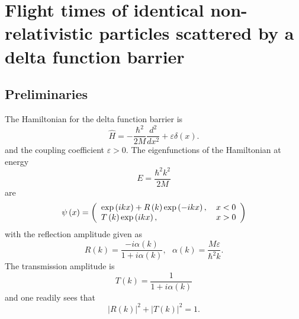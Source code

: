 \documentclass[preprint,aps]{revtex4}
\begin{document}
\bigskip 

\bigskip 



\renewcommand{\theequation}{4.\arabic{equation}} \setcounter{section}{3} %
\setcounter{equation}{0}

\section{\protect\bigskip Flight times of identical non-relativistic particles scattered by a
delta function barrier}

\subsection{Preliminaries}

The Hamiltonian for the delta function barrier is
\begin{equation}
\hat{H}=-\frac{\hbar ^{2}}{2M}\frac{d^{2}}{dx^{2}}+\varepsilon \delta \left(
x\right) .  \label{3.1}
\end{equation}%
and the coupling coefficient $\varepsilon >0$. The eigenfunctions of the
Hamiltonian at energy
\begin{equation}
E=\frac{\hbar ^{2}k^{2}}{2M}  \label{3.2}
\end{equation}%
are
\begin{equation}
\psi \left( x\right) =\left(
\begin{array}{c}
\exp \left( ikx\right) +R\left( k\right) \exp \left( -ikx\right) ,\text{ \ \
}x<0 \\
T\left( k\right) \exp \left( ikx\right) ,\text{ \ \ \ \ \ \ \ \ \ \ \ \ \ \
\ \ \ \ \ \ }x>0%
\end{array}%
\right)  \label{3.3}
\end{equation}%
with the reflection amplitude given as
\begin{equation}
R\left( k\right) =\frac{-i\alpha \left( k\right) }{1+i\alpha \left( k\right)
},\text{ \ \ }\alpha \left( k\right) =\frac{M\varepsilon }{\hbar ^{2}k}.
\label{3.4}
\end{equation}%
The transmission amplitude is
\begin{equation}
T\left( k\right) =\frac{1}{1+i\alpha \left( k\right) }  \label{3.5}
\end{equation}%
and one readily sees that
\begin{equation}
\left\vert R\left( k\right) \right\vert ^{2}+\left\vert T\left( k\right)
\right\vert ^{2}=1.  \label{3.6}
\end{equation}
\end{document}
